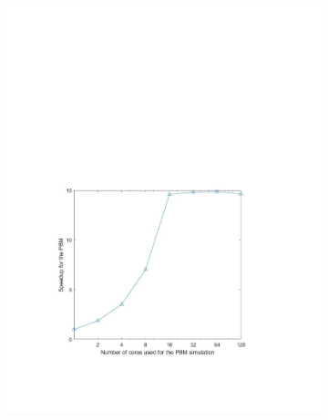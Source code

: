 \documentclass[preprint,11pt,authoryear]{elsarticle}
\begin{document}
\begin{figure}
\begin{subfigure}{.45\textwidth}
\centering
\includegraphics[scale=0.5]{rslsts_PBM_speedup_logx.pdf}
\caption{}
\label{fig:rslts_PBM_speed_up}
\end{subfigure}\hfill
\begin{subfigure}{.45\textwidth}
\centering

\end{subfigure}
\end{figure}
\end{document}
